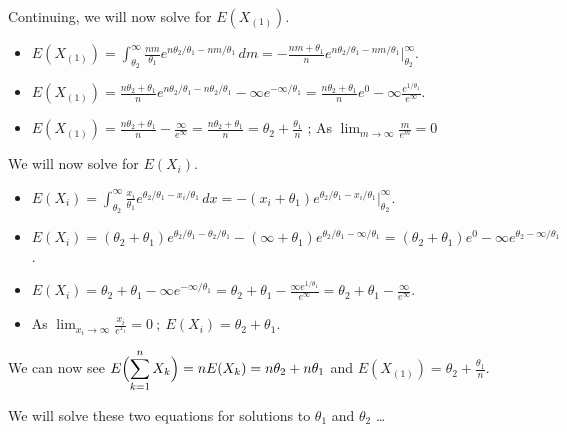 \documentclass[12pt]{article}
\newcommand{\XB}{\color{black}}
\newcommand{\ds}{\displaystyle}
\begin{document}
\noindent
Continuing, we will now solve for $ E( X_{(1)} ) $.

\begin{itemize}
    \item $ \ds E( X_{(1)} ) = \int_{\theta_{2}}^{\infty} \frac{nm}{\theta_{1}}e^{n\theta_{2} / \theta_{1} - nm / \theta_{1}} \, dm = - \frac{nm + \theta_{1}}{n} e^{n\theta_{2} / \theta_{1} - nm / \theta_{1}} \Big|_{\theta_{2}}^{\infty} $.
    \item $ \ds E( X_{(1)} ) = \frac{n\theta_{2} + \theta_{1}}{n} e^{n\theta_{2} / \theta_{1} - n\theta_{2} / \theta_{1}} - \infty e^{- \infty / \theta_{1}} = \frac{n\theta_{2} + \theta_{1}}{n} e^{0} - \infty \frac{e^{1 / \theta_{1}}}{e^{\infty}}  $.
    \item $ \ds E( X_{(1)} ) = \frac{n\theta_{2} + \theta_{1}}{n} - \frac{\infty}{e^{\infty}} = \frac{n\theta_{2} + \theta_{1}}{n} = \theta_{2} + \frac{\theta_{1}}{n} $ ; As $ \ds \lim_{m \to \infty} \frac{m}{e^{m}} = 0 $
\end{itemize} \XB

\noindent
We will now solve for $ E( X_{i} ) $.

\begin{itemize}
    \item $ \ds E( X_{i} ) = \int_{\theta_{2}}^{\infty} \frac{x_{i}}{\theta_{1}}e^{\theta_{2} / \theta_{1} - x_{i} / \theta_{1}} \,dx = -(x_{i} + \theta_{1}) e^{\theta_{2} / \theta_{1} - x_{i} / \theta_{1}} \Big|_{\theta_2}^{\infty} $.
    \item $ \ds E( X_{i} ) = (\theta_{2} + \theta_{1}) e^{\theta_{2} / \theta_{1} - \theta_{2} / \theta_{1}} - (\infty + \theta_{1}) e^{\theta_{2} / \theta_{1} - \infty / \theta_{1}} = (\theta_{2} + \theta_{1}) e^{0} - \infty e^{\theta_{2} - \infty / \theta_{1}} $.
    \item $ \ds E( X_{i} ) = \theta_{2} + \theta_{1} - \infty e^{-\infty / \theta_{1}} = \theta_{2} + \theta_{1} - \frac{\infty e^{1 / \theta_{1}}}{e^{\infty}} = \theta_{2} + \theta_{1} - \frac{\infty}{e^{\infty}} $.
    \item As $ \ds \lim_{x_{i} \to \infty} \frac{x_{i}}{e^{x_{i}}} = 0 \ ; \ E( X_{i} ) = \theta_{2} + \theta_{1} $.
\end{itemize}

\noindent
We can now see $ \ds E\Bigl( \sum_{k=1}^{n} X_{k} \Bigr) = n E( X_{k} ) = n\theta_{2} + n\theta_{1} $ and $ \ds E( X_{(1)} ) = \theta_{2} + \frac{\theta_{1}}{n} $. \\
\newpage

\noindent
We will solve these two equations for solutions to $ \theta_{1} $ and $ \theta_{2} $ \dots
\end{document}
